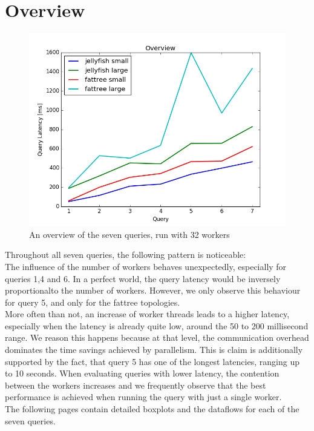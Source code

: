 \documentclass[11pt,singlecolumn]{scrartcl}
\begin{document}
\section{Overview}
\begin{figure}[H]
\includegraphics[width=1\textwidth]{ov}
\caption{An overview of the seven queries, run with 32 workers}
\end{figure}
Throughout all seven queries, the following pattern is noticeable:\\
The influence of the number of workers behaves unexpectedly, especially for queries 1,4 and 6. In a perfect world, the query latency would be inversely proportionalto the number of workers. However, we only observe this behaviour for query 5, and only for the fattree topologies.\\More often than not, an increase of worker threads leads to a higher latency, especially when the latency is already quite low, around the 50 to 200 millisecond range. We reason this happens because at that level, the communication overhead dominates the time savings achieved by parallelism. This is claim is additionally supported by the fact, that query 5 has one of the longest latencies, ranging up to 10 seconds. When evaluating queries with lower latency, the contention between the workers increases and we frequently observe that the best performance is achieved when running the query with just a single worker.\\
The following pages contain detailed boxplots and the dataflows for each of the seven queries.

\clearpage
\end{document}
